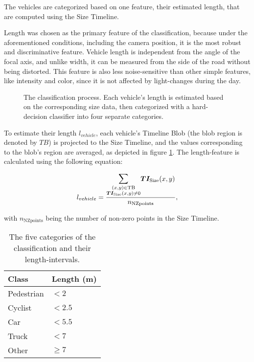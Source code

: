 The vehicles are categorized based on one feature, their estimated length, that are computed using the Size Timeline.

Length was chosen as the primary feature of the classification, because under the aforementioned conditions, including the camera position, it is the most robust and discriminative feature.
Vehicle length is independent from the angle of the focal axis, and unlike width, it can be measured from the side of the road without being distorted.
This feature is also less noise-sensitive than other simple features, like intensity and color, since it is not affected by light-changes during the day.

\begin{figure}[!h]
	\centering
	
	\caption{The classification process. Each vehicle's length is estimated based on the corresponding size data, then categorized with a hard-decision classifier into four separate categories. \label{fig:classification}}
\end{figure}

To estimate their length $l_{vehicle}$, each vehicle's Timeline Blob (the blob region is denoted by $TB$) is projected to the Size Timeline, and the values corresponding to the blob's region are averaged, as depicted in figure \ref{fig:classification}. 
The length-feature is calculated using the following equation:

\begin{displaymath}
	l_{vehicle} = \frac{\mathlarger{\mathlarger{\sum}}\limits_{\substack{(x,y) \in \text{TB} \\ \boldsymbol{TI_{\text{Size}}}(x,y)\neq 0}} \boldsymbol{TI_{\text{Size}}}(x,y)}{n_{\text{NZpoints}}},
\end{displaymath}

with $n_{\text{NZpoints}}$ being the number of non-zero points in the Size Timeline.

\begin{table}[!h]
	\centering
	\begin{tabular}{ll}
		\toprule
		\textbf{Class} & \textbf{Length (m)} \\
		\midrule
		Pedestrian     & $< 2$               \\
		Cyclist        & $< 2.5$             \\
		Car            & $< 5.5$             \\
		Truck          & $< 7$               \\
		Other          & $ \geq 7$    \\
		\bottomrule          
	\end{tabular}
\caption{The five categories of the classification and their length-intervals.}
\label{tab:intervals}
\end{table}

